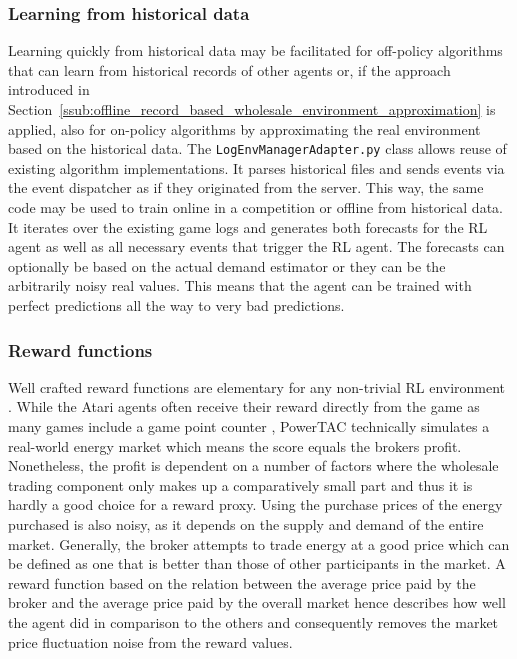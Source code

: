 \subsubsection{Learning from historical data}%
\label{sub:learning_from_historical_data}

Learning quickly from historical data may be facilitated for off-policy algorithms that can learn from historical
records of other agents or, if the approach introduced in
Section~\ref{ssub:offline_record_based_wholesale_environment_approximation} is applied, also for on-policy algorithms by
approximating the real environment based on the historical data.
The \texttt{LogEnvManagerAdapter.py} class allows reuse of existing algorithm implementations. It
parses historical files and sends events via the event dispatcher as if they originated from the server. This way, the
same code may be used to train online in a competition or offline from historical data. It iterates over the existing
game logs and generates both forecasts for the \ac{RL} agent as well as all necessary events that trigger the \ac{RL}
agent. The forecasts can optionally be based on the actual demand estimator or they can be the arbitrarily noisy real
values. This means that the agent can be trained with perfect predictions all the way to very bad predictions.

\subsubsection{Reward functions}%
\label{sub:reward_functions}

Well crafted reward functions are elementary for any non-trivial \ac{RL}
environment \cite[p.469ff.]{amodei2016concrete, sutton2018reinforcement}. While the Atari agents often receive their reward directly from the
game as many games include a game point counter \cite[]{mnih2013playing}, \ac{PowerTAC} technically simulates a
real-world energy market which means the score equals the brokers profit. Nonetheless, the profit is dependent on a number of
factors where the wholesale trading component only makes up a comparatively small part and thus it is hardly a
good choice for a reward proxy. Using the purchase prices of the energy purchased is also noisy, as it depends on the
supply and demand of the entire market. Generally, the broker attempts to trade energy at a good price which can be
defined as one that is better than those of other participants in the market. A reward function based on the relation
between the average price paid by the broker and the average price paid by the overall market hence describes
how well the agent did in comparison to the others and consequently removes the market price fluctuation noise from the
reward values.


